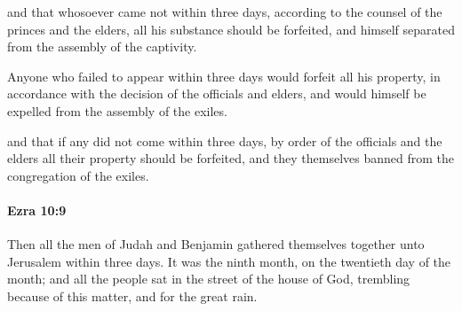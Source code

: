			\begin{versebox}
					\item[BHS] 
					\item[LXX] 
					\item[ASV] and that whosoever came not within three days, according to the counsel of the princes and the elders, all his substance should be forfeited, and himself separated from the assembly of the captivity.
					\item[NIV] Anyone who failed to appear within three days would forfeit all his property, in accordance with the decision of the officials and elders, and would himself be expelled from the assembly of the exiles.
					\item[NRSV] and that if any did not come within three days, by order of the officials and the elders all their property should be forfeited, and they themselves banned from the congregation of the exiles.
			\end{versebox}

		\paragraph{Ezra 10:9} %
			\label{EZRA-10-9}

			Then all the men of Judah and Benjamin gathered themselves together unto Jerusalem within three days. It was the ninth month, on the twentieth day of the month; and all the people sat in the street of the house of God, trembling because of this matter, and for the great rain.

